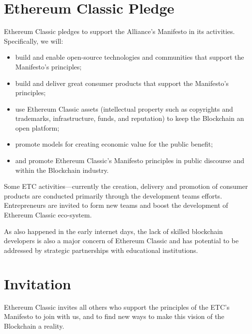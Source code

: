 \documentclass[twoside,twocolumn]{article}
\begin{document}
\section{Ethereum Classic Pledge}
Ethereum Classic pledges to support the Alliance's Manifesto in
its activities. Specifically, we will:

\begin{itemize}
  \item build and enable open-source technologies and communities that support
  the Manifesto’s principles;
  \item build and deliver great consumer products that support the Manifesto’s
  principles;
  \item use Ethereum Classic assets (intellectual property such as copyrights and
  trademarks, infrastructure, funds, and reputation) to keep the Blockchain an
  open platform;
  \item promote models for creating economic value for the public benefit;
  \item and promote Ethereum Classic's Manifesto principles in public discourse and
  within the Blockchain industry.
\end{itemize}

Some ETC activities—currently the creation, delivery and promotion of
consumer products are conducted primarily through the development teams efforts.
Entrepreneurs are invited to form new teams and boost the development of
Ethereum Classic eco-system.

As also happened in the early internet days, the lack of skilled
blockchain developers is also a major concern of Ethereum Classic and has
potential to be addressed by strategic partnerships with educational institutions.

\section{Invitation}

Ethereum Classic invites all others who support the principles of the
ETC's Manifesto to join with us, and to find new ways to make this vision
of the Blockchain a reality.


\end{document}
